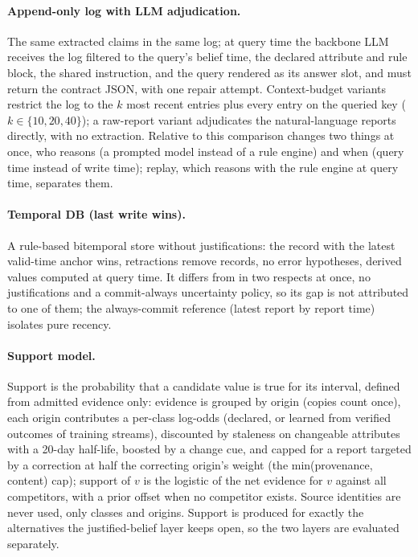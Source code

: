 \paragraph{Append-only log with LLM adjudication.} The same extracted claims in the same log; at query time the backbone LLM receives the log filtered to the query's belief time, the declared attribute and rule block, the shared instruction, and the query rendered as its answer slot, and must return the contract JSON, with one repair attempt. Context-budget variants restrict the log to the $k$ most recent entries plus every entry on the queried key ($k\in\{10,20,40\}$); a raw-report variant adjudicates the natural-language reports directly, with no extraction. Relative to \pal{} this comparison changes two things at once, who reasons (a prompted model instead of a rule engine) and when (query time instead of write time); replay, which reasons with the rule engine at query time, separates them.

\paragraph{Temporal DB (last write wins).} A rule-based bitemporal store without justifications: the record with the latest valid-time anchor wins, retractions remove records, no error hypotheses, derived values computed at query time. It differs from \pal{} in two respects at once, no justifications and a commit-always uncertainty policy, so its gap is not attributed to one of them; the always-commit reference (latest report by report time) isolates pure recency.

\paragraph{Support model.}\label{sec:support} Support is the probability that a candidate value is true for its interval, defined from admitted evidence only: evidence is grouped by origin (copies count once), each origin contributes a per-class log-odds (declared, or learned from verified outcomes of training streams), discounted by staleness on changeable attributes with a 20-day half-life, boosted by a change cue, and capped for a report targeted by a correction at half the correcting origin's weight (the min(provenance, content) cap); support of $v$ is the logistic of the net evidence for $v$ against all competitors, with a prior offset when no competitor exists. Source identities are never used, only classes and origins. Support is produced for exactly the alternatives the justified-belief layer keeps open, so the two layers are evaluated separately.

